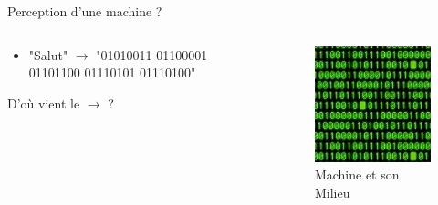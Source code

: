 \documentclass{beamer}
\begin{document}
\begin{frame}{Perception d'une machine ?}
\begin{columns}
\begin{column}{0.5\textwidth}
\begin{block}{}
 
\begin{itemize}
    \item "Salut" $\to$ "01010011 01100001 01101100 01110101 01110100"
\end{itemize}
D'où vient le $\to$ ?

\end{block}
\end{column}
\begin{column}{0.6\textwidth}
\begin{block}{}
\begin{figure}
    \centering
    \includegraphics[width=\textwidth]{Machine_language.jpeg}
    \caption{Machine et son Milieu}
    \label{fig:macmil}
\end{figure}
\end{block}
\end{column}
\end{columns}
\end{frame}
\end{document}
